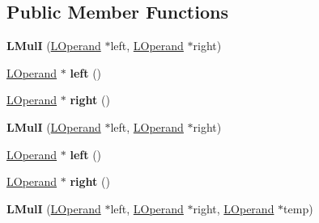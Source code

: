 \subsection*{Public Member Functions}
\begin{DoxyCompactItemize}
\item 
{\bfseries L\+MulI} (\hyperlink{classv8_1_1internal_1_1_l_operand}{L\+Operand} $\ast$left, \hyperlink{classv8_1_1internal_1_1_l_operand}{L\+Operand} $\ast$right)\hypertarget{classv8_1_1internal_1_1_l_mul_i_a737c33beaa3c46fdb51ea53644d3fb05}{}\label{classv8_1_1internal_1_1_l_mul_i_a737c33beaa3c46fdb51ea53644d3fb05}

\item 
\hyperlink{classv8_1_1internal_1_1_l_operand}{L\+Operand} $\ast$ {\bfseries left} ()\hypertarget{classv8_1_1internal_1_1_l_mul_i_ae68736354423918dde94b30e0d86ecf4}{}\label{classv8_1_1internal_1_1_l_mul_i_ae68736354423918dde94b30e0d86ecf4}

\item 
\hyperlink{classv8_1_1internal_1_1_l_operand}{L\+Operand} $\ast$ {\bfseries right} ()\hypertarget{classv8_1_1internal_1_1_l_mul_i_a71251abcac64e497fe599adf9d8150e2}{}\label{classv8_1_1internal_1_1_l_mul_i_a71251abcac64e497fe599adf9d8150e2}

\item 
{\bfseries L\+MulI} (\hyperlink{classv8_1_1internal_1_1_l_operand}{L\+Operand} $\ast$left, \hyperlink{classv8_1_1internal_1_1_l_operand}{L\+Operand} $\ast$right)\hypertarget{classv8_1_1internal_1_1_l_mul_i_a737c33beaa3c46fdb51ea53644d3fb05}{}\label{classv8_1_1internal_1_1_l_mul_i_a737c33beaa3c46fdb51ea53644d3fb05}

\item 
\hyperlink{classv8_1_1internal_1_1_l_operand}{L\+Operand} $\ast$ {\bfseries left} ()\hypertarget{classv8_1_1internal_1_1_l_mul_i_ae68736354423918dde94b30e0d86ecf4}{}\label{classv8_1_1internal_1_1_l_mul_i_ae68736354423918dde94b30e0d86ecf4}

\item 
\hyperlink{classv8_1_1internal_1_1_l_operand}{L\+Operand} $\ast$ {\bfseries right} ()\hypertarget{classv8_1_1internal_1_1_l_mul_i_a71251abcac64e497fe599adf9d8150e2}{}\label{classv8_1_1internal_1_1_l_mul_i_a71251abcac64e497fe599adf9d8150e2}

\item 
{\bfseries L\+MulI} (\hyperlink{classv8_1_1internal_1_1_l_operand}{L\+Operand} $\ast$left, \hyperlink{classv8_1_1internal_1_1_l_operand}{L\+Operand} $\ast$right, \hyperlink{classv8_1_1internal_1_1_l_operand}{L\+Operand} $\ast$temp)\hypertarget{classv8_1_1internal_1_1_l_mul_i_a37918016a1518a2c0b86dbd938267754}{}\label{classv8_1_1internal_1_1_l_mul_i_a37918016a1518a2c0b86dbd938267754}


\end{DoxyCompactItemize}
